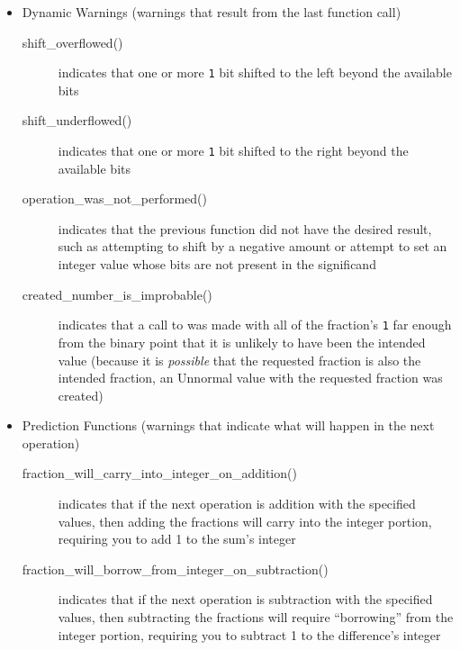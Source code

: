 \begin{itemize}
    \item Dynamic Warnings (warnings that result from the last function call)
    \begin{description}
        \item[shift\_overflowed()] indicates that one or more \lstinline{1} bit shifted to the left beyond the available bits
        \item[shift\_underflowed()] indicates that one or more \lstinline{1} bit shifted to the right beyond the available bits
        \item[operation\_was\_not\_performed()] indicates that the previous function did not have the desired result, such as attempting to shift by a negative amount or attempt to set an integer value whose bits are not present in the significand
        \item[created\_number\_is\_improbable()] indicates that a call to  was made with all of the fraction's \lstinline{1} far enough from the binary point that it is unlikely to have been the intended value (because it is \textit{possible} that the requested fraction is also the intended fraction, an Unnormal value with the requested fraction was created)
    \end{description}
    \item Prediction Functions (warnings that indicate what will happen in the next operation)
    \begin{description}
        \item[fraction\_will\_carry\_into\_integer\_on\_addition()] indicates that if the next operation is addition with the specified values, then adding the fractions will carry into the integer portion, requiring you to add 1 to the sum's integer
        \item[fraction\_will\_borrow\_from\_integer\_on\_subtraction()] indicates that if the next operation is subtraction with the specified values, then subtracting the fractions will require ``borrowing'' from the integer portion, requiring you to subtract 1 to the difference's integer

\end{description}
\end{itemize}
